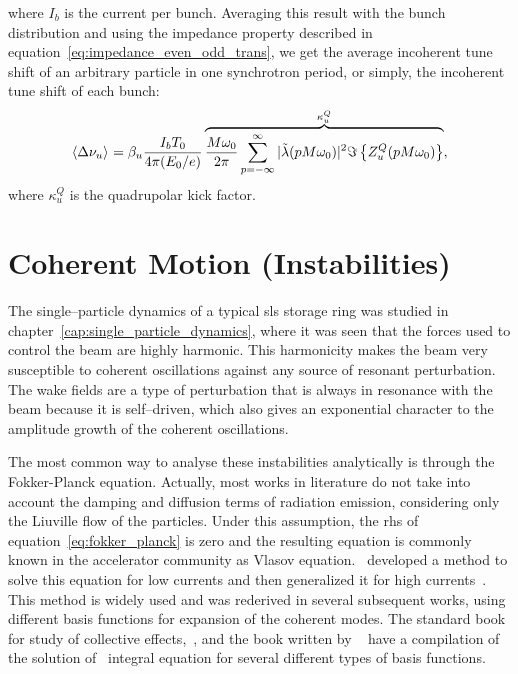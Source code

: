     where $I_b$ is the current per bunch. Averaging this result with the bunch distribution and using the impedance property described in equation~\eqref{eq:impedance_even_odd_trans}, we get the average incoherent tune shift of an arbitrary particle in one synchrotron period, or simply, the incoherent tune shift of each bunch:
    \begin{align}\label{eq:incoherent_tune_shift}
        \left\langle \Delta\nu_u \right\rangle_{{}} = \beta_u\frac{I_bT_0}{4\pi(E_0/e)}
        \overbrace{
        \frac{M\omega_0}{2\pi} \sum_{p=-\infty}^\infty |\tilde{\lambda}(pM\omega_0)|^2\Im\left\{Z^Q_u(pM\omega_0)\right\}}^{\kappa^Q_u},
    \end{align}
    where $\kappa^Q_u$ is the quadrupolar kick factor.

\section{Coherent Motion (Instabilities)}

    The single--particle dynamics of a typical \gls{sls} storage ring was studied in chapter~\ref{cap:single_particle_dynamics}, where it was seen that the forces used to control the beam are highly harmonic. This harmonicity makes the beam very susceptible to coherent oscillations against any source of resonant perturbation. The wake fields are a type of perturbation that is always in resonance with the beam because it is self--driven, which also gives an exponential character to the amplitude growth of the coherent oscillations.

    The most common way to analyse these instabilities analytically is through the Fokker-Planck equation. Actually, most works in literature do not take into account the damping and diffusion terms of radiation emission, considering only the Liuville flow of the particles. Under this assumption, the \gls{rhs} of equation~\eqref{eq:fokker_planck} is zero and the resulting equation is commonly known in the accelerator community as Vlasov equation.~ developed a method to solve this equation for low currents and then generalized it for high currents~\cite{Sacherer1977}. This method is widely used and was rederived in several subsequent works, using different basis functions for expansion of the coherent modes. The standard book for study of collective effects,~, and the book written by ~ have a compilation of the solution of~ integral equation for several different types of basis functions.

